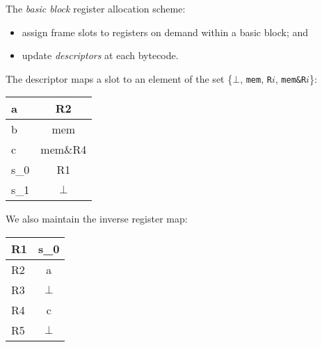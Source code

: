 \begin{slide*}
The {\em basic block\/} register allocation scheme:

\begin{itemize}
\item assign frame slots to registers on demand within a basic block; and
\item update {\em descriptors\/} at each bytecode.
\end{itemize}
\vspace*{2em}

The descriptor maps a slot to an element of the set 
\{$\bot$, {\tt mem}, {\tt R$i$}, {\tt mem\&R$i$}\}:
\begin{scriptsize}
\begin{tt}
\begin{center}
\begin{tabular}{|l|c|}
\hline
a & R2 \\\hline
b & mem \\\hline
c & mem\&R4 \\\hline
s\_0 & R1 \\\hline
s\_1 & $\bot$ \\\hline
\end{tabular}
\end{center}
\end{tt}
\end{scriptsize}

We also maintain the inverse register map:
\begin{scriptsize}
\begin{tt}
\begin{center}
\begin{tabular}{|l|c|}
\hline
R1 & s\_0 \\\hline
R2 & a\\\hline
R3 & $\bot$\\\hline
R4 & c\\\hline
R5 & $\bot$\\\hline
\end{tabular}
\end{center}
\end{tt}
\end{scriptsize}
\vfil
\end{slide*}
 

